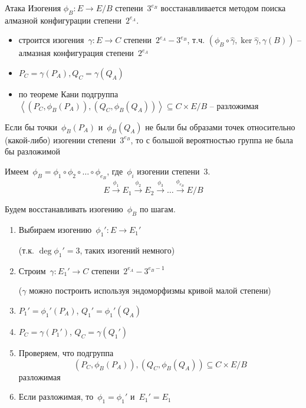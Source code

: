 \documentclass{beamer}
\begin{document}
\begin{frame}{Атака}
	Изогения $\phi_B: E \rightarrow E/B$ степени~$3^{e_B}$ восстанавливается методом поиска алмазной конфигурации степени~$2^{{e_A}}$.
	
	\begin{itemize}
		\item строится изогения~$\gamma: E \rightarrow C$ степени~$2^{{e_A}} - 3^{{e_B}}$, т.ч. $(\phi_B \circ \widehat{\gamma}, \ker{\widehat{\gamma}}, \gamma(B))$ -- алмазная конфигурация степени~$2^{e_A}$
		\item $P_C = \gamma(P_A), Q_C = \gamma(Q_A)$
		\item по теореме Кани подгруппа $\left< (P_C, \phi_B(P_A)), (Q_C, \phi_B(Q_A)) \right> \subseteq C \times E/B$ -- разложимая
	\end{itemize}
\vspace{1em}
	 Если бы точки~$\phi_B(P_A)$ и~$\phi_B(Q_A)$ не были бы образами точек относительно (какой-либо) изогении степени~$3^{e_B}$, то с большой вероятностью группа не была бы разложимой
\end{frame}


\begin{frame}{}
Имеем~$\phi_B = \phi_1 \circ \phi_2 \circ \ldots \circ \phi_{e_B}$, где~$\phi_i$ изогении степени~$3$.
\[
E \xrightarrow{\phi_1} E_1  \xrightarrow{\phi_2} E_2 \xrightarrow{\phi_3} \ldots \xrightarrow{\phi_{e_B}} E/B
\]

Будем восстанавливать изогению~$\phi_B$ по шагам.

\begin{enumerate}
	\item Выбираем изогению~$\phi_1': E \rightarrow E_1'$ 
	
	(т.к. $\deg \phi_1' = 3$, таких изогений немного)
	\item Строим~$\gamma: E_1' \rightarrow C$ степени~$2^{e_A} - 3^{e_B-1}$
	
	($\gamma$ можно построить используя эндоморфизмы кривой малой степени)
	\item $P_1' = \phi_1'(P_A)$, $Q_1' = \phi_1'(Q_A)$
	\item $P_C = \gamma(P_1')$, $Q_C = \gamma(Q_1')$
	\item Проверяем, что подгруппа \[(P_C, \phi_B(P_A)), (Q_C, \phi_B(Q_A)) \subseteq C \times E/B\] разложимая
	\item Если разложимая, то~$\phi_1 = \phi_1'$ и~$E_1' = E_1$
\end{enumerate}
\end{frame}
\end{document}
